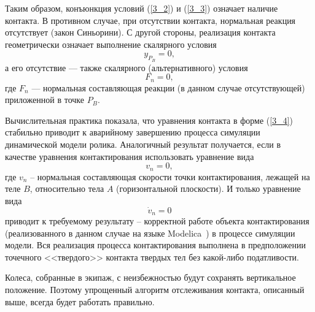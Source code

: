 Таким образом, конъюнкция условий (\ref{3_2}) и (\ref{3_3}) означает наличие
контакта. В противном случае, при отсутствии контакта, нормальная реакция 
отсутствует (закон Синьорини). С другой стороны, реализация контакта 
геометрически означает выполнение скалярного условия 
\begin{equation}
y_{P_B}=0,
\label{3_4}
\end{equation}
а его отсутствие --- также скалярного (альтернативного) условия
$$
F_n=0,
$$
где $F_n$ --- нормальная составляющая реакции (в данном случае отсутствующей) 
приложенной в точке $P_B$.


Вычислительная практика показала, что уравнения контакта в форме (\ref{3_4})
стабильно приводит к аварийному завершению процесса симуляции динамической 
модели ролика. Аналогичный результат получается, если в качестве уравнения 
контактирования использовать уравнение вида 
$$
v_n=0,
$$
где $v_n$ -- нормальная составляющая скорости точки контактирования, лежащей
на теле $B$, относительно тела $A$ (горизонтальной плоскости). И только 
уравнение вида
$$
\dot{v}_n=0
$$
приводит к требуемому результату -- корректной работе объекта контактирования
(реализованного в данном случае на языке Modelica~\cite{Fritzson}) в процессе 
симуляции модели. Вся реализация процесса контактирования 
выполнена в предположении точечного <<твердого>> контакта твердых тел без 
какой-либо податливости.

Колеса, собранные в экипаж, с неизбежностью будут сохранять вертикальное 
положение. Поэтому упрощенный алгоритм отслеживания контакта, описанный выше,
всегда будет работать правильно.
